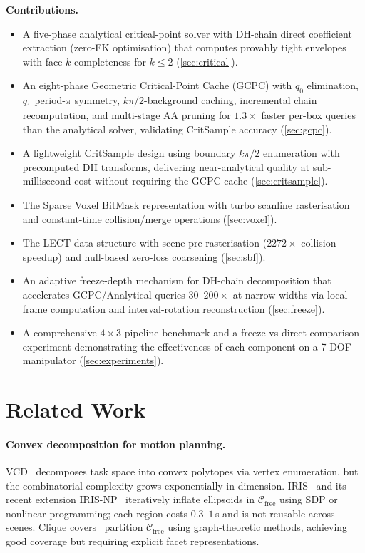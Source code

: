 \documentclass[journal]{IEEEtran}
\newcommand{\Cfree}{\mathcal{C}_\text{free}}
\begin{document}
\textbf{Contributions.}
\begin{itemize}
  \item A five-phase analytical critical-point solver with
    DH-chain direct coefficient extraction (zero-FK
    optimisation) that computes provably tight envelopes with
    face-$k$ completeness for $k \leq 2$
    (\cref{sec:critical}).
  \item An eight-phase Geometric Critical-Point Cache (GCPC)
    with $q_0$ elimination, $q_1$ period-$\pi$ symmetry,
    $k\pi/2$-background caching, incremental chain
    recomputation, and multi-stage AA pruning for
    $1.3{\times}$ faster per-box queries than the analytical solver,
    validating CritSample accuracy (\cref{sec:gcpc}).
  \item A lightweight CritSample design using boundary
    $k\pi/2$ enumeration with precomputed DH transforms,
    delivering near-analytical quality at sub-millisecond
    cost without requiring the GCPC cache
    (\cref{sec:critsample}).
  \item The Sparse Voxel BitMask representation with turbo
    scanline rasterisation and constant-time collision/merge
    operations (\cref{sec:voxel}).
  \item The LECT data structure with scene pre-rasterisation
    ($2272{\times}$ collision speedup) and hull-based
    zero-loss coarsening (\cref{sec:sbf}).
  \item An adaptive freeze-depth mechanism for DH-chain
    decomposition that accelerates GCPC/Analytical queries
    $30$--$200{\times}$ at narrow widths via local-frame
    computation and interval-rotation reconstruction
    (\cref{sec:freeze}).
  \item A comprehensive $4{\times}3$ pipeline benchmark
    and a freeze-vs-direct comparison experiment
    demonstrating the effectiveness of each component on
    a 7-DOF manipulator (\cref{sec:experiments}).
\end{itemize}

\section{Related Work}\label{sec:related}

\paragraph{Convex decomposition for motion planning.}
VCD~\cite{werner2024vcd} decomposes task space into convex polytopes
via vertex enumeration, but the combinatorial complexity grows
exponentially in dimension.
IRIS~\cite{deits2015computing} and its recent extension
IRIS-NP~\cite{werner2024fast} iteratively inflate ellipsoids
in $\Cfree$ using SDP or nonlinear programming;
each region costs $0.3$--$1$\,s and is not reusable across scenes.
Clique covers~\cite{amice2024clique} partition $\Cfree$ using
graph-theoretic methods, achieving good coverage but requiring
explicit facet representations.
\end{document}
